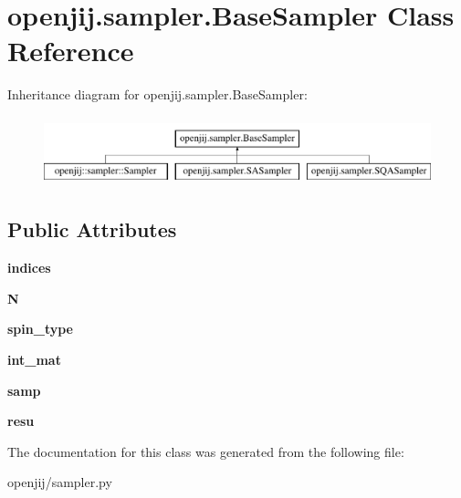 \hypertarget{classopenjij_1_1sampler_1_1_base_sampler}{}\section{openjij.\+sampler.\+Base\+Sampler Class Reference}
\label{classopenjij_1_1sampler_1_1_base_sampler}
Inheritance diagram for openjij.\+sampler.\+Base\+Sampler\+:\begin{figure}[H]
\begin{center}
\leavevmode
\includegraphics[height=2.000000cm]{classopenjij_1_1sampler_1_1_base_sampler}
\end{center}
\end{figure}
\subsection*{Public Attributes}
\begin{DoxyCompactItemize}
\item 
\mbox{\label{classopenjij_1_1sampler_1_1_base_sampler_a129f4511b544861ceb4992e562ac35c9}} 
{\bfseries indices}
\item 
\mbox{\label{classopenjij_1_1sampler_1_1_base_sampler_aa3126819b7a6681f97c1182160cc494e}} 
{\bfseries N}
\item 
\mbox{\label{classopenjij_1_1sampler_1_1_base_sampler_a955a9a19cee0e428854ed23eaf5483be}} 
{\bfseries spin\+\_\+type}
\item 
\mbox{\label{classopenjij_1_1sampler_1_1_base_sampler_a2aee9733e4febe0f9efacaec3cc60aba}} 
{\bfseries int\+\_\+mat}
\item 
\mbox{\label{classopenjij_1_1sampler_1_1_base_sampler_a7dcf2eea182c24ac31fbc63be7451d7d}} 
{\bfseries samp}
\item 
\mbox{\label{classopenjij_1_1sampler_1_1_base_sampler_a59f2cbd511a0f66d9bcf63226b3dcd76}} 
{\bfseries resu}
\end{DoxyCompactItemize}


The documentation for this class was generated from the following file\+:\begin{DoxyCompactItemize}
\item 
openjij/sampler.\+py\end{DoxyCompactItemize}
